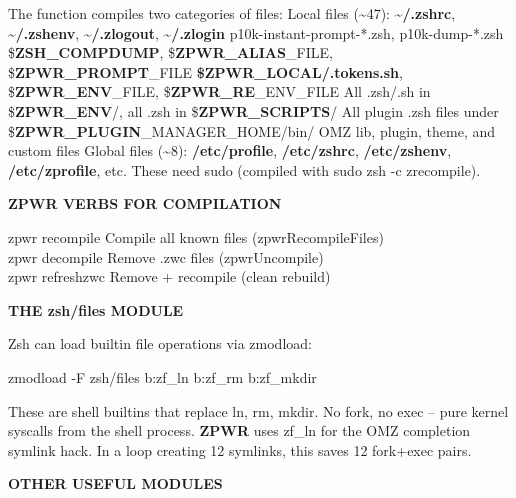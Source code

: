 \documentclass[11pt,a4paper,twoside]{book}
\begin{document}
The function compiles two categories of files: Local files (\textasciitilde{}47): \textbf{\textasciitilde{}/.zshrc}, \textbf{\textasciitilde{}/.zshenv}, \textbf{\textasciitilde{}/.zlogout}, \textbf{\textasciitilde{}/.zlogin} p10k-instant-prompt-*.zsh, p10k-dump-*.zsh \$\textbf{ZSH\_COMPDUMP}, \$\textbf{ZPWR\_ALIAS}\_FILE, \$\textbf{ZPWR\_PROMPT}\_FILE \textbf{\$ZPWR\_LOCAL/.tokens.sh}, \$\textbf{ZPWR\_ENV}\_FILE, \$\textbf{ZPWR\_RE}\_ENV\_FILE All .zsh/.sh in \$\textbf{ZPWR\_ENV}/, all .zsh in \$\textbf{ZPWR\_SCRIPTS}/ All plugin .zsh files under \$\textbf{ZPWR\_PLUGIN}\_MANAGER\_HOME/bin/ OMZ lib, plugin, theme, and custom files Global files (\textasciitilde{}8): \textbf{\textbf{/etc/profile}}, \textbf{\textbf{/etc/zshrc}}, \textbf{\textbf{/etc/zshenv}}, \textbf{\textbf{/etc/zprofile}}, etc. These need sudo (compiled with sudo zsh -c zrecompile).


\vspace{12pt}
{\bfseries\color{neonyellow} \textbf{ZPWR} VERBS FOR COMPILATION}\vspace{4pt}

\begin{codebox}
\color{neongreen}zpwr recompile       Compile all known files (zpwrRecompileFiles)\\
\color{neongreen}zpwr decompile       Remove .zwc files (zpwrUncompile)\\
\color{neongreen}zpwr refreshzwc      Remove + recompile (clean rebuild)\\
\end{codebox}


\vspace{12pt}
{\bfseries\color{neonyellow} THE zsh/files MODULE}\vspace{4pt}

Zsh can load builtin file operations via zmodload:

\begin{codebox}
\color{neongreen}zmodload -F zsh/files b:zf\_ln b:zf\_rm b:zf\_mkdir\\
\end{codebox}

These are shell builtins that replace ln, rm, mkdir. No fork, no exec -- pure kernel syscalls from the shell process. \textbf{ZPWR} uses zf\_ln for the OMZ completion symlink hack. In a loop creating 12 symlinks, this saves 12 fork+exec pairs.


\vspace{12pt}
{\bfseries\color{neonyellow} OTHER USEFUL MODULES}\vspace{4pt}
\end{document}
